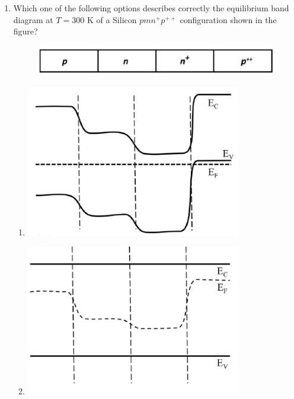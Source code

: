 \documentclass[a4paper, 11pt]{article}
\begin{document}
\begin{enumerate}
    \hfill{}

    \item Which one of the following options describes correctly the equilibrium band diagram at $T=300$ K of a Silicon $pmn^{+}p^{++}$ configuration shown in the figure?
    \begin{figure}[H]
        \centering
        \includegraphics[width=0.5\columnwidth]{figs/q8.png}
        \caption*{}
        \label{fig:q8}
    \end{figure}
    \begin{enumerate}
            \item \includegraphics[width=0.9\columnwidth]{figs/q8A.png}
            \item \includegraphics[width=0.9\columnwidth]{figs/q8B.png}

\end{enumerate}
\end{enumerate}
\end{document}
